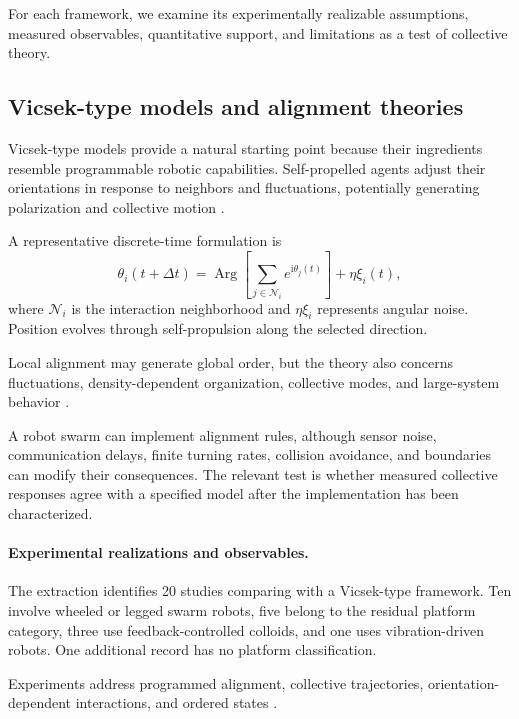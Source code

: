 For each framework, we examine its experimentally
realizable assumptions, measured observables,
quantitative support, and limitations as a
test of collective theory.

\subsection{Vicsek-type models and alignment theories}
\label{sec:theory-vicsek}

Vicsek-type models provide a natural starting point
because their ingredients resemble programmable
robotic capabilities. Self-propelled agents adjust
their orientations in response to neighbors and
fluctuations, potentially generating polarization
and collective motion \cite{Vicsek1995novel}.

A representative discrete-time formulation is
\begin{equation}
\theta_i(t+\Delta t)=
\operatorname{Arg}
\left[
\sum_{j\in\mathcal N_i}
e^{\mathrm{i}\theta_j(t)}
\right]
+\eta\xi_i(t),
\label{eq:theory-vicsek}
\end{equation}
where $\mathcal N_i$ is the interaction neighborhood
and $\eta\xi_i$ represents angular noise.
Position evolves through self-propulsion
along the selected direction.

Local alignment may generate global order,
but the theory also concerns fluctuations,
density-dependent organization, collective
modes, and large-system behavior
\cite{Toner1995longrange,Vicsek1995novel}.

A robot swarm can implement alignment rules,
although sensor noise, communication delays,
finite turning rates, collision avoidance,
and boundaries can modify their consequences.
The relevant test is whether measured
collective responses agree with a specified
model after the implementation has been
characterized.

\paragraph*{Experimental realizations and observables.}

The extraction identifies 20 studies comparing
with a Vicsek-type framework. Ten involve
wheeled or legged swarm robots, five belong
to the residual platform category, three
use feedback-controlled colloids, and one
uses vibration-driven robots. One additional
record has no platform classification.

Experiments address programmed alignment,
collective trajectories, orientation-dependent
interactions, and ordered states
\cite{Turgut2008selforganizedflocka,Tarcai2011patternstransition,Vsrhelyi2014outdoorflockingand,Balzs2020adaptiveleadership,Fernando2021onlineflockingcont,Wang2022optiswarmopticals,Xiao2023perceptionofmotion,Zheng2024bodyorientationcha,Jianchao2024emergentchiralitya,Verdoucq2025flockingphasetrans,Zheng2026nestedinteractionn,Dizenhaus2026anonymousleadership,Zhang2026noiseresilientimpl,Yasuda2014selforganizedflockb}.

